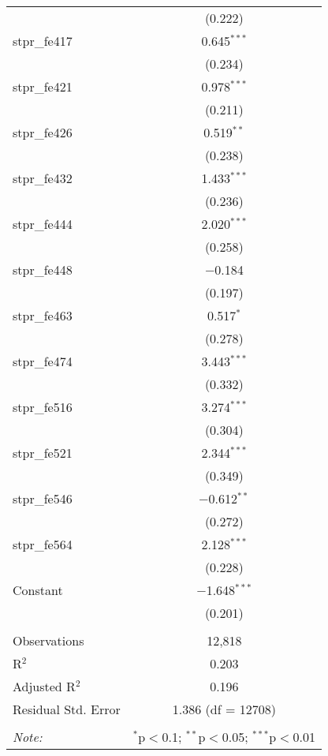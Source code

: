 \begin{table}[!htbp]
\begin{tabular}{@{\extracolsep{5pt}}lc}
  & (0.222) \\ 
  stpr\_fe417 & 0.645$^{***}$ \\ 
  & (0.234) \\ 
  stpr\_fe421 & 0.978$^{***}$ \\ 
  & (0.211) \\ 
  stpr\_fe426 & 0.519$^{**}$ \\ 
  & (0.238) \\ 
  stpr\_fe432 & 1.433$^{***}$ \\ 
  & (0.236) \\ 
  stpr\_fe444 & 2.020$^{***}$ \\ 
  & (0.258) \\ 
  stpr\_fe448 & $-$0.184 \\ 
  & (0.197) \\ 
  stpr\_fe463 & 0.517$^{*}$ \\ 
  & (0.278) \\ 
  stpr\_fe474 & 3.443$^{***}$ \\ 
  & (0.332) \\ 
  stpr\_fe516 & 3.274$^{***}$ \\ 
  & (0.304) \\ 
  stpr\_fe521 & 2.344$^{***}$ \\ 
  & (0.349) \\ 
  stpr\_fe546 & $-$0.612$^{**}$ \\ 
  & (0.272) \\ 
  stpr\_fe564 & 2.128$^{***}$ \\ 
  & (0.228) \\ 
  Constant & $-$1.648$^{***}$ \\ 
  & (0.201) \\ 
 \hline \\[-1.8ex] 
Observations & 12,818 \\ 
R$^{2}$ & 0.203 \\ 
Adjusted R$^{2}$ & 0.196 \\ 
Residual Std. Error & 1.386 (df = 12708) \\ 
\hline 
\hline \\[-1.8ex] 
\textit{Note:}  & \multicolumn{1}{r}{$^{*}$p$<$0.1; $^{**}$p$<$0.05; $^{***}$p$<$0.01} \\ 
\end{tabular} 
\end{table} 
